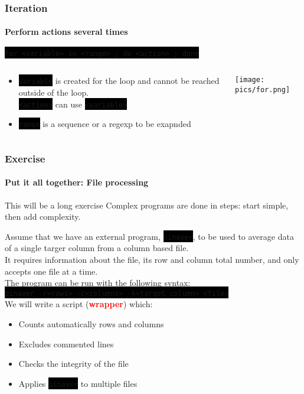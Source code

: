 \documentclass[unknownkeysallowed, 10pt, a4 paper, handout]{beamer}
\newcommand{\focus}[1]{\textbf{\textcolor{red}{#1}}}
\newcommand{\code}[1]{\colorbox{black}{\color{green}\texttt{#1}}}
\begin{document}
\begin{frame}
  \frametitle{Iteration}
  \framesubtitle{Perform actions several times}

  \begin{block}{}
    \code{for <variable> in <range> ; do <action> ; done}
  \end{block}

  \begin{exampleblock}{}
    \begin{columns}
      \begin{column}{0.60\textwidth}
        \begin{itemize}
          \item \code{variable} is created for the loop and cannot be
             reached outside of the loop. \\
             \code{<action>} can use \code{<variable>}
          \item \code{range} is a sequence or a regexp to be exapnded
        \end{itemize}
      \end{column}
      \begin{column}{0.40\textwidth}
        \texttt{[image: pics/for.png]}
      \end{column}
    \end{columns}
  \end{exampleblock}
\end{frame}

\begin{frame}
  \frametitle{Exercise}
  \framesubtitle{Put it all together: File processing}

  \begin{alertblock}{This will be a long exercise}
    Complex programs are done in steps: start simple, then add complexity.
   \end{alertblock}

  \begin{exampleblock}{}
    Assume that we have an external program, \code{binaver}, to be used to
    average data of a single targer column from a column based file. \\
    It requires information about the file, its row and column total number,
    and only accepts one file at a time. \\
    The program can be run with the following syntax: \\

    \code{binaver -r<rows> -c<columns> -k<target\_column> <file>}\\

    We will write a script (\focus{wrapper}) which:

    \begin{itemize}
      \item Counts automatically rows and columns
      \item Excludes commented lines
      \item Checks the integrity of the file
      \item Applies \code{binaver} to multiple files
    \end{itemize}
  \end{exampleblock}
\end{frame}
\end{document}
